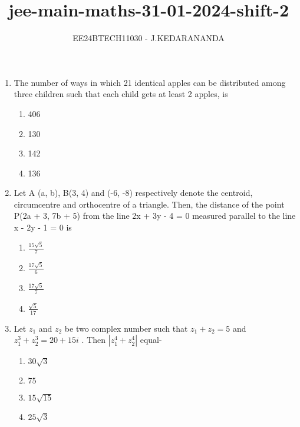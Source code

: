 \documentclass[journal]{IEEEtran}
\renewcommand{\thefigure}{\theenumi}
\renewcommand{\thetable}{\theenumi}
\numberwithin{equation}{enumi}
\numberwithin{figure}{enumi}
\renewcommand{\thetable}{\theenumi}
\begin{document}

\vspace{3cm}

\title{jee-main-maths-31-01-2024-shift-2}
\author{EE24BTECH11030 - J.KEDARANANDA}
{\let\newpage\relax\maketitle}
\renewcommand{\thefigure}{\theenumi}
\renewcommand{\thetable}{\theenumi}
\begin{enumerate}
    \item  The number of ways in which 21 identical apples can be distributed among three children such that each child gets at least 2 apples, is 
    \begin{multicols}{4}
    \begin{enumerate}
        \item 406
        \item 130
        \item 142
        \item 136
    \end{enumerate}
    \end{multicols}
    \bigskip
    \item Let A (a, b), B(3, 4) and (-6, -8) respectively denote the centroid, circumcentre and orthocentre of a triangle. Then, the distance of the point P(2a + 3, 7b + 5) from the line 2x + 3y - 4 = 0 measured parallel to the line x - 2y - 1 = 0 is  
    \begin{multicols}{4}
    \begin{enumerate}
        \item $\frac{15\sqrt{5}}{7}$
        \item $\frac{17\sqrt{5}}{6}$
        \item $\frac{17\sqrt{5}}{7}$
        \item $\frac{\sqrt{5}}{17}$
    \end{enumerate} 
    \end{multicols}
    \bigskip
    \item Let $z_1$ and $z_2$ be two complex number such that $z_1 + z_2 = 5$ and $z_1^3 + z_2^3 = 20 + 15i$ . Then  $|z_1^{4} + z_2^{4}|$ equal-
    \begin{multicols}{4}
    \begin{enumerate}
        \item $30\sqrt{3}$
        \item $75$
        \item $15\sqrt{15}$
        \item $25\sqrt{3}$
    \end{enumerate} 
    \end{multicols}
    \bigskip
    

\end{enumerate}
\end{document}
